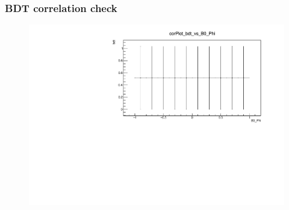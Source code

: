 \documentclass{beamer}
\begin{document}
\begin{frame}
  \frametitle{BDT correlation check}

  \begin{figure}
  \includegraphics[width=1.0\linewidth]{plots/corPlot_bdt_vs_B0_Phi.pdf}
  \end{figure}

\end{frame}



\end{document}
